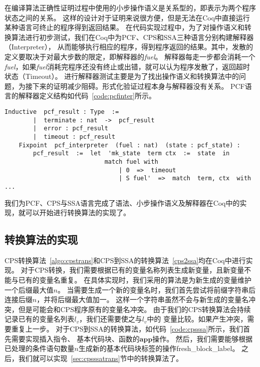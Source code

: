 在编译算法正确性证明过程中使用的小步操作语义是关系型的，即表示为两个程序状态之间的关系。
这样的设计对于证明来说很方便，但是无法在Coq中直接运行某种语言可终止的程序得到返回结果。
在代码实现过程中，为了对操作语义和转换算法进行初步测试，我们在Coq中为PCF、CPS和SSA三种语言分别构建解释器（Interpreter），
从而能够执行相应的程序，得到程序返回的结果。其中，发散的定义要取决于对最大步数的限定，即解释器的\textit{fuel}。
解释器每走一步都会消耗一个\textit{fuel}，如果\textit{fuel}消耗完程序还没有终止或出错，就可以认为程序发散了，返回超时状态（Timeout）。
进行解释器测试主要是为了找出操作语义和转换算法中的问题，为接下来的证明减少阻碍。形式化验证过程本身与解释器没有关系。
PCF语言的解释器定义结构如代码~\ref{code:pcfinter}所示。

\vspace{1ex}
\begin{lstlisting}[language=Coq, caption=Coq中的PCF语言的解释器, label=code:pcfinter]
    Inductive  pcf_result : Type  := 
        |  terminate : nat  ->  pcf_result 
        |  error : pcf_result
        |  timeout : pcf_result
    Fixpoint  pcf_interpreter  (fuel : nat)  (state : pcf_state) : 
        pcf_result  :=  let  'mk_state  term ctx  :=  state  in
                            match fuel with 
                                | 0  =>  timeout 
                                | S fuel'  =>  match  term, ctx  with ...
\end{lstlisting}

我们为PCF、CPS与SSA语言完成了语法、小步操作语义及解释器在Coq中的实现，就可以开始进行转换算法的实现了。

\subsection{转换算法的实现}

CPS转换算法~\ref{algo:cpstrans}和CPS到SSA的转换算法~\ref{cps2ssa}均在Coq中进行实现。
对于CPS转换，我们需要根据已有的变量名称列表生成新变量，且新变量不能与已有的变量名重复。
在具体实现时，我们采用的算法是为新生成的变量维护一个后缀最大值$n$。
当需要生成一个新的变量名时，我们首先尝试将前缀字符串后连接后缀$n$，并将后缀最大值加一。
这样一个字符串虽然不会与新生成的变量名冲突，但是可能会和CPS程序原有的变量名冲突。
由于我们的CPS转换算法会持续记录已有的变量名列表$l_v$，我们还需要使之与$l_v$中的
变量比较。如果产生冲突，需要重复上一步。
对于CPS到SSA的转换算法，如代码~\ref{code:cpsssa}所示，我们首先需要实现插入指令、
基本代码块、函数的$\mathbf{app}$操作。
然后，我们需要能够根据已处理的条件语句数量$n$生成新的基本代码块标签的操作fresh\_block\_label。
之后，我们就可以实现~\ref{sec:cpsssatrans}节中的转换算法了。

